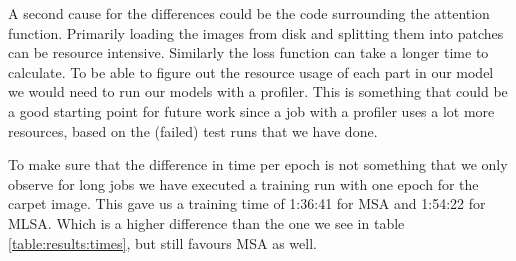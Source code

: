 A second cause for the differences could be the code surrounding the attention function. Primarily loading the images from disk and splitting them into patches can be resource intensive. Similarly the loss function can take a longer time to calculate. To be able to figure out the resource usage of each part in our model we would need to run our models with a profiler. This is something that could be a good starting point for future work since a job with a profiler uses a lot more resources, based on the (failed) test runs that we have done.

To make sure that the difference in time per epoch is not something that we only observe for long jobs we have executed a training run with one epoch for the carpet image. This gave us a training time of 1:36:41 for MSA and 1:54:22 for MLSA. Which is a higher difference than the one we see in table \ref{table:results:times}, but still favours MSA as well.